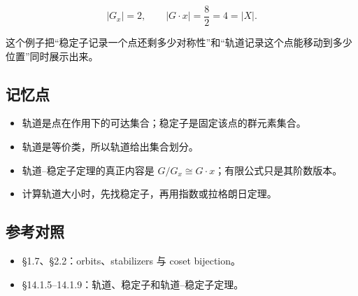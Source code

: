 \[
|G_x|=2,
\qquad |G\cdot x|=\frac{8}{2}=4=|X|.
\]

这个例子把“稳定子记录一个点还剩多少对称性”和“轨道记录这个点能移动到多少位置”同时展示出来。

\subsection{记忆点}


\begin{itemize}
\item 轨道是点在作用下的可达集合；稳定子是固定该点的群元素集合。
\item 轨道是等价类，所以轨道给出集合划分。
\item 轨道--稳定子定理的真正内容是 $G/G_x\cong G\cdot x$；有限公式只是其阶数版本。
\item 计算轨道大小时，先找稳定子，再用指数或拉格朗日定理。
\end{itemize}


\subsection{参考对照}


\begin{itemize}
\item [DF] §1.7、§2.2：orbits、stabilizers 与 coset bijection。
\item [DS] §14.1.5–14.1.9：轨道、稳定子和轨道--稳定子定理。
\end{itemize}
